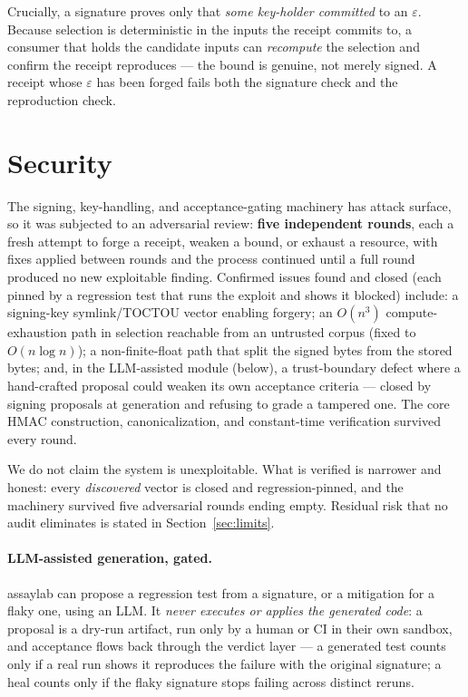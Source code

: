 \documentclass[11pt]{article}
\newcommand{\eps}{\varepsilon}
\begin{document}
Crucially, a signature proves only that \emph{some key-holder committed} to an
$\eps$. Because selection is deterministic in the inputs the receipt commits to,
a consumer that holds the candidate inputs can \emph{recompute} the selection
and confirm the receipt reproduces --- the bound is genuine, not merely signed.
A receipt whose $\eps$ has been forged fails both the signature check and the
reproduction check.

\section{Security}
\label{sec:security}

The signing, key-handling, and acceptance-gating machinery has attack surface,
so it was subjected to an adversarial review: \textbf{five independent rounds},
each a fresh attempt to forge a receipt, weaken a bound, or exhaust a resource,
with fixes applied between rounds and the process continued until a full round
produced no new exploitable finding. Confirmed issues found and closed (each
pinned by a regression test that runs the exploit and shows it blocked) include:
a signing-key symlink/TOCTOU vector enabling forgery; an $O(n^3)$
compute-exhaustion path in selection reachable from an untrusted corpus (fixed to
$O(n\log n)$); a non-finite-float path that split the signed bytes from the
stored bytes; and, in the LLM-assisted module (below), a trust-boundary defect
where a hand-crafted proposal could weaken its own acceptance criteria --- closed
by signing proposals at generation and refusing to grade a tampered one. The
core HMAC construction, canonicalization, and constant-time verification survived
every round.

We do not claim the system is unexploitable. What is verified is narrower and
honest: every \emph{discovered} vector is closed and regression-pinned, and the
machinery survived five adversarial rounds ending empty. Residual risk that no
audit eliminates is stated in Section~\ref{sec:limits}.

\paragraph{LLM-assisted generation, gated.} assaylab can propose a regression
test from a signature, or a mitigation for a flaky one, using an LLM. It
\emph{never executes or applies the generated code}: a proposal is a dry-run
artifact, run only by a human or CI in their own sandbox, and acceptance flows
back through the verdict layer --- a generated test counts only if a real run
shows it reproduces the failure with the original signature; a heal counts only
if the flaky signature stops failing across distinct reruns.
\end{document}
